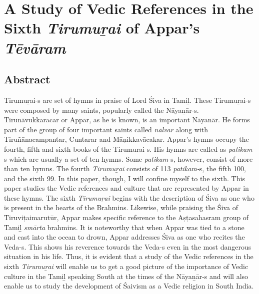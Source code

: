 
\chapter{A Study of Vedic References in the Sixth \textit{Tirumuṟai} of Appar’s \textit{Tēvāram}}\label{intro}



\section*{Abstract}

Tirumuṟai-s are set of hymns in praise of Lord Śiva in Tamiḻ. These Tirumuṟai-s were composed by many saints, popularly called the Nāyaṉār-s. Tirunāvukkaracar or Appar, as he is known, is an important Nāyanār. He forms part of the group of four important saints called \textit{nālvar} along with Tiruñānacampantar, Cuntarar and Māṇikkavācakar. Appar’s hymns occupy the fourth, fifth and sixth books of the Tirumuṟai-s. His hymns are called as \textit{patikam-}s which are usually a set of ten hymns. Some \textit{patikam-}s, however, consist of more than ten hymns. The fourth \textit{Tirumuṟai} consists of 113 \textit{patikam-}s, the fifth 100, and the sixth 99. In this paper, though, I will confine myself to the sixth. This paper studies the Vedic references and culture that are represented by Appar in these hymns. The sixth \textit{Tirumuṟai} begins with the description of Śiva as one who is present in the hearts of the Brahmins. Likewise, while praising the Śiva of Tiruviṭaimarutūr, Appar makes specific reference to the Aṣṭasahasram group of Tamiḻ \textit{smārta} brahmins. It is noteworthy that when Appar was tied to a stone and cast into the ocean to drown, Appar addresses Śiva as one who recites the Veda-s. This shows his reverence towards the Veda-s even in the most dangerous situation in his life. Thus, it is evident that a study of the Vedic references in the sixth \textit{Tirumuṟai} will enable us to get a good picture of the importance of Vedic culture in the Tamiḻ speaking South at the times of the Nāyaṉār-s and will also enable us to study the development of Śaivism as a Vedic religion in South India.

